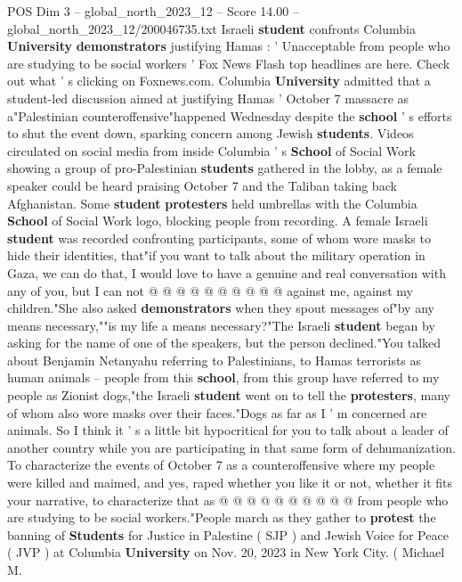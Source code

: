 \begin{textsample}{POS Dim 3 – global\_north\_2023\_12 – Score 14.00 – global\_north\_2023\_12/200046735.txt}  \label{ex:f3_pos_262}
Israeli \textbf{student} confronts Columbia \textbf{University} \textbf{demonstrators} justifying Hamas : ' Unacceptable from people who are studying to be social workers ' Fox News Flash top headlines are here.
Check out what ' s clicking on Foxnews.com.
Columbia \textbf{University} admitted that a student-led discussion aimed at justifying Hamas ' October 7 massacre as a"Palestinian counteroffensive"happened Wednesday despite the \textbf{school} ' s efforts to shut the event down, sparking concern among Jewish \textbf{students}.
Videos circulated on social media from inside Columbia ' s \textbf{School} of Social Work showing a group of pro-Palestinian \textbf{students} gathered in the lobby, as a female speaker could be heard praising October 7 and the Taliban taking back Afghanistan.
Some \textbf{student} \textbf{protesters} held umbrellas with the Columbia \textbf{School} of Social Work logo, blocking people from recording.
A female Israeli \textbf{student} was recorded confronting participants, some of whom wore masks to hide their identities, that"if you want to talk about the military operation in Gaza, we can do that, I would love to have a genuine and real conversation with any of you, but I can not @ @ @ @ @ @ @ @ @ @ against me, against my children."She also asked \textbf{demonstrators} when they spout messages of"by any means necessary,""is my life a means necessary?"The Israeli \textbf{student} began by asking for the name of one of the speakers, but the person declined."You talked about Benjamin Netanyahu referring to Palestinians, to Hamas terrorists as human animals -- people from this \textbf{school}, from this group have referred to my people as Zionist dogs,"the Israeli \textbf{student} went on to tell the \textbf{protesters}, many of whom also wore masks over their faces."Dogs as far as I ' m concerned are animals.
So I think it ' s a little bit hypocritical for you to talk about a leader of another country while you are participating in that same form of dehumanization.
To characterize the events of October 7 as a counteroffensive where my people were killed and maimed, and yes, raped whether you like it or not, whether it fits your narrative, to characterize that as @ @ @ @ @ @ @ @ @ @ from people who are studying to be social workers."People march as they gather to \textbf{protest} the banning of \textbf{Students} for Justice in Palestine ( SJP ) and Jewish Voice for Peace ( JVP ) at Columbia \textbf{University} on Nov. 20, 2023 in New York City. ( Michael M.

\end{textsample}
